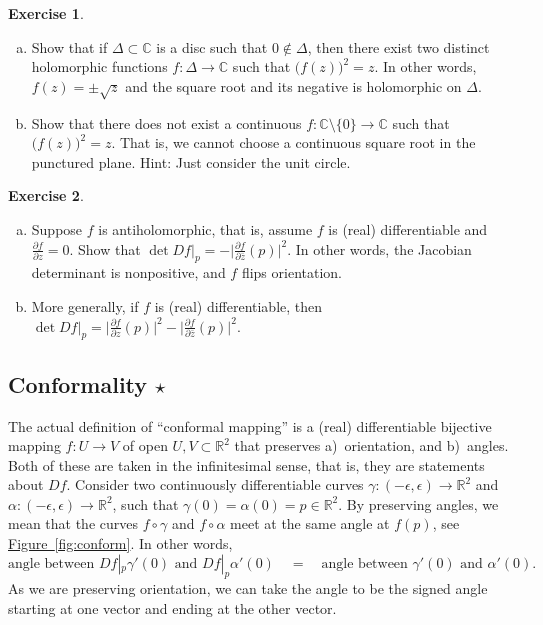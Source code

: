 \documentclass[12pt,openany]{book}
\newcommand{\babs}[1]{\bigl\lvert {#1} \bigr\rvert}
\newcommand{\C}{{\mathbb{C}}}
\newcommand{\R}{{\mathbb{R}}}
\newcommand{\myquote}[1]{``#1''}
\theoremstyle{plain}
\theoremstyle{remark}
\theoremstyle{definition}
\newenvironment{exbox}{%
    \def\FrameCommand{\vrule width 1pt \relax\hspace{10pt}}%
    \MakeFramed{\advance\hsize-\width\FrameRestore}%
}{%
    \endMakeFramed
}
\newenvironment{exparts}{%
    \leavevmode\begin{enumerate}[a),noitemsep,topsep=0pt,parsep=0pt,partopsep=0pt]
}{%
    \end{enumerate}
}
\theoremstyle{exercise}
\newtheorem{exercise}{Exercise}[section]
\theoremstyle{example}
\newcommand{\figureref}[1]{\hyperref[#1]{Figure~\ref*{#1}}}
\begin{document}
\begin{exbox}
\begin{exercise}
\begin{exparts}
\item
Show that if $\Delta \subset \C$ is a disc such that $0 \notin \Delta$, then
there exist two distinct holomorphic functions $f \colon \Delta \to \C$ such that
${\bigl(f(z)\bigr)}^2 = z$.  In other words, $f(z) = \pm \sqrt{z}$ and the
square root and its negative is holomorphic on $\Delta$.
\item
Show that there does not exist a continuous $f \colon \C \setminus \{ 0 \}
\to \C$ such that ${\bigl(f(z)\bigr)}^2 = z$.  That is, we cannot choose a
continuous square root in the punctured plane.  Hint: Just consider the unit
circle.
\end{exparts}
\end{exercise}

\begin{exercise}
\begin{exparts}
\item
Suppose $f$ is antiholomorphic, that is, assume $f$ is (real) differentiable
and $\frac{\partial f}{\partial z} = 0$.  Show that
$\det Df\big|_p = - \babs{\frac{\partial f}{\partial \bar{z}}(p)}^2$.  In other words,
the Jacobian determinant is nonpositive, and $f$ flips orientation.
\item
More generally, if $f$ is (real) differentiable, then
$\det Df\big|_p = \babs{\frac{\partial f}{\partial z}(p)}^2 -
\babs{\frac{\partial f}{\partial \bar{z}}(p)}^2$.
\end{exparts}
\end{exercise}
\end{exbox}

\subsection{Conformality \texorpdfstring{$\star$}{*}}

The actual definition of \myquote{conformal mapping} is 
a (real) differentiable bijective mapping $f \colon U \to V$ of open
$U, V \subset \R^2$ that preserves
a)~orientation, and b)~angles.
Both of these are taken in the infinitesimal sense, that is, they are
statements about $Df$.  Consider two continuously differentiable curves
$\gamma \colon (-\epsilon,\epsilon) \to \R^2$ and
$\alpha \colon (-\epsilon,\epsilon) \to \R^2$, such that
$\gamma(0)=\alpha(0) = p \in \R^2$.  By preserving angles, we
mean that the curves $f \circ \gamma$ and $f \circ \alpha$ meet at the same
angle at $f(p)$, see \figureref{fig:conform}.  In other words,
\begin{equation*}
\text{angle between } Df|_p \gamma'(0) \text{ and }
Df|_p \alpha'(0)
\quad = \quad
\text{angle between } \gamma'(0) \text{ and } \alpha'(0) .
\end{equation*}
As we are preserving orientation,
we can take the angle to be the signed angle starting at one vector and
ending at the other vector. 
\end{document}
